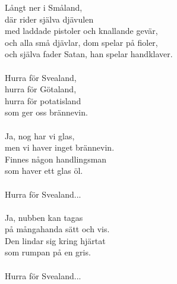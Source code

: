 \vspace{10pt}
Långt ner i Småland,\\
där rider själva djävulen\\
med laddade pistoler och knallande gevär,\\
och alla små djävlar, dom spelar på fioler,\\
och själva fader Satan, han spelar handklaver.\\
\\
Hurra för Svealand,\\
hurra för Götaland,\\
hurra för potatisland\\
som ger oss brännevin.\\
\\
Ja, nog har vi glas,\\
men vi haver inget brännevin.\\
Finnes någon handlingsman\\
som haver ett glas öl.\\
\\
Hurra för Svealand...\\
\\
Ja, nubben kan tagas\\
på mångahanda sätt och vis.\\
Den lindar sig kring hjärtat\\
som rumpan på en gris.\\
\\
Hurra för Svealand...
